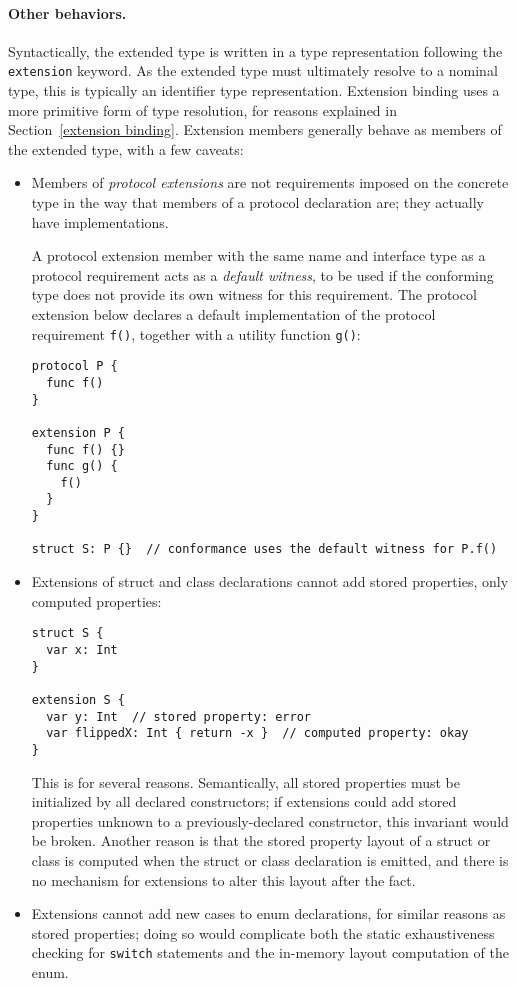 \documentclass[../generics]{subfiles}
\begin{document}
\paragraph{Other behaviors.} Syntactically, the extended type is written in a type representation following the \texttt{extension} keyword. As the extended type must ultimately resolve to a nominal type, this is typically an identifier type representation. Extension binding uses a more primitive form of type resolution, for reasons explained in Section~\ref{extension binding}.  Extension members generally behave as members of the extended type, with a few caveats:
\begin{itemize}
\item Members of \emph{protocol extensions} are not requirements imposed on the concrete type in the way that members of a protocol declaration are; they actually have implementations.

A protocol extension member with the same name and interface type as a protocol requirement acts as a \emph{default witness}, to be used if the conforming type does not provide its own witness for this requirement. The protocol extension below declares a default implementation of the protocol requirement \texttt{f()}, together with a utility function \texttt{g()}:
\begin{Verbatim}
protocol P {
  func f()
}

extension P {
  func f() {}
  func g() {
    f()
  }
}

struct S: P {}  // conformance uses the default witness for P.f()
\end{Verbatim}
\item Extensions of struct and class declarations cannot add stored properties, only computed properties:
\begin{Verbatim}
struct S {
  var x: Int
}

extension S {
  var y: Int  // stored property: error
  var flippedX: Int { return -x }  // computed property: okay
}
\end{Verbatim}
This is for several reasons. Semantically, all stored properties must be initialized by all declared constructors; if extensions could add stored properties unknown to a previously-declared constructor, this invariant would be broken. Another reason is that the stored property layout of a struct or class is computed when the struct or class declaration is emitted, and there is no mechanism for extensions to alter this layout after the fact.
\item Extensions cannot add new cases to enum declarations, for similar reasons as stored properties; doing so would complicate both the static exhaustiveness checking for \texttt{switch} statements and the in-memory layout computation of the enum.


\end{itemize}
\end{document}
